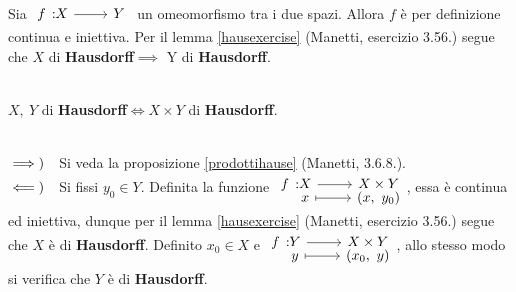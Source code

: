 \begin{demonstration}
Sia $\funz{f}{X}{Y}$ un omeomorfismo tra i due spazi. Allora $f$ è per definizione continua e iniettiva. Per il lemma \ref{hausexercise} (Manetti, esercizio 3.56.) segue che $X$ di \textbf{Hausdorff}$\implies$ Y di \textbf{Hausdorff}.
\end{demonstration}
\begin{theorema}~{}\\
$X,\ Y$ di \textbf{Hausdorff}$\iff X\times Y$ di \textbf{Hausdorff}.
\end{theorema}
\begin{demonstration}~{}\\
$\implies)\quad$Si veda la proposizione \ref{prodottihause} (Manetti, 3.6.8.).\\
$\impliedby)\quad$Si fissi $y_0\in Y$. Definita la funzione $\funztot{f}{X}{X\times Y}{x}{\left(x,\ y_0\right)}$, essa è continua ed iniettiva, dunque per il lemma \ref{hausexercise} (Manetti, esercizio 3.56.) segue che $X$ è di \textbf{Hausdorff}. Definito $x_0\in X$ e $\funztot{f}{Y}{X\times Y}{y}{\left(x_0,\ y\right)}$, allo stesso modo si verifica che $Y$ è di \textbf{Hausdorff}.
\end{demonstration}